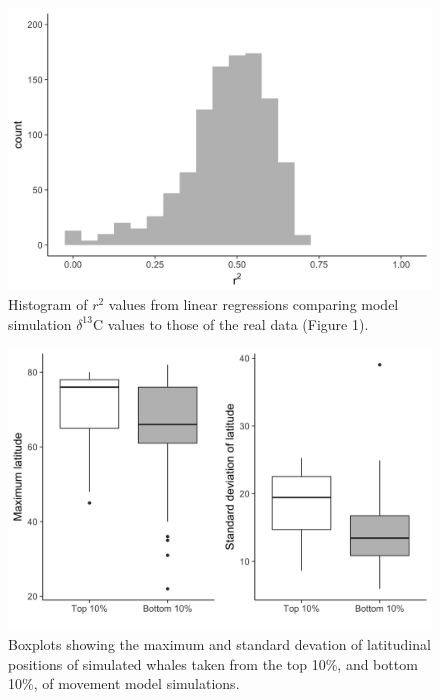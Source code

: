 \documentclass[a4paper,12pt]{article}
\begin{document}
  \begin{figure}[!htbp]
    \centering
      \includegraphics[width=\linewidth]{figures/Figure-S6-r2.png}
      \caption{Histogram of $r^2$ values from linear regressions comparing model simulation $\delta^{13}$C values to those of the real data (Figure 1).} %
      \label{figs6}
  \end{figure}

    \begin{figure}[!htbp]
    \centering
      \includegraphics[width=\linewidth]{figures/Figure-S7-boxplots.png}
      \caption{Boxplots showing the maximum and standard devation of latitudinal positions of simulated whales taken from the top 10\%, and bottom 10\%, of movement model simulations.} 
      \label{figs7}
  \end{figure}
\end{document}
